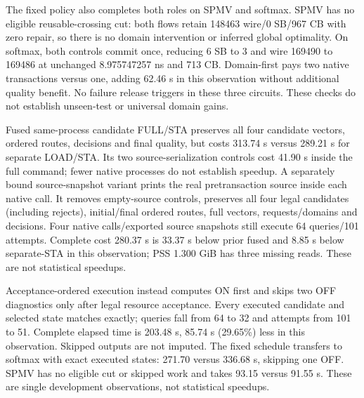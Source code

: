 \documentclass[conference,10pt]{IEEEtran}
\begin{document}
The fixed policy also completes both roles on SPMV and softmax. SPMV has no eligible reusable-crossing cut: both flows retain 148463 wire/0 SB/967 CB with zero repair, so there is no domain intervention or inferred global optimality. On softmax, both controls commit once, reducing 6 SB to 3 and wire 169490 to 169486 at unchanged 8.975747257 ns and 713 CB. Domain-first pays two native transactions versus one, adding 62.46 s in this observation without additional quality benefit. No failure release triggers in these three circuits. These checks do not establish unseen-test or universal domain gains.

Fused same-process candidate FULL/STA preserves all four candidate vectors, ordered routes, decisions and final quality, but costs 313.74 s versus 289.21 s for separate LOAD/STA. Its two source-serialization controls cost 41.90 s inside the full command; fewer native processes do not establish speedup. A separately bound source-snapshot variant prints the real pretransaction source inside each native call. It removes empty-source controls, preserves all four legal candidates (including rejects), initial/final ordered routes, full vectors, requests/domains and decisions. Four native calls/exported source snapshots still execute 64 queries/101 attempts. Complete cost 280.37 s is 33.37 s below prior fused and 8.85 s below separate-STA in this observation; PSS 1.300 GiB has three missing reads. These are not statistical speedups.

Acceptance-ordered execution instead computes ON first and skips two OFF diagnostics only after legal resource acceptance. Every executed candidate and selected state matches exactly; queries fall from 64 to 32 and attempts from 101 to 51. Complete elapsed time is 203.48 s, 85.74 s (29.65\%) less in this observation. Skipped outputs are not imputed. The fixed schedule transfers to softmax with exact executed states: 271.70 versus 336.68 s, skipping one OFF. SPMV has no eligible cut or skipped work and takes 93.15 versus 91.55 s. These are single development observations, not statistical speedups.
\end{document}
